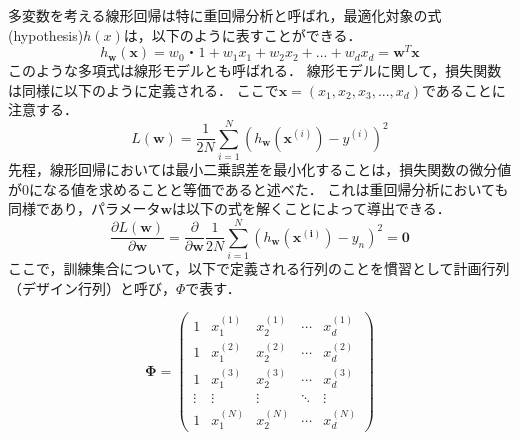     多変数を考える線形回帰は特に重回帰分析と呼ばれ，最適化対象の式(hypothesis)$h(x)$は，以下のように表すことができる．
    \begin{equation}
        h_{\bm{w}}(\bm{x}) = w_0・1 + w_1 x_1 + w_2 x_2 + ...  + w_d x_d = \bm{w}^T\bm{x}
    \end{equation}
    このような多項式は線形モデルとも呼ばれる．
    線形モデルに関して，損失関数は同様に以下のように定義される．
    ここで$\bm{x}=(x_1, x_2, x_3, ... , x_d)$であることに注意する．
    \begin{equation}
        L(\bm{w}) = \frac{1}{2N}\sum_{i=1}^{N}\left(h_{\bm{w}}(\bm{x}^{(i)})-y^{(i)}\right)^2
        \label{linerregression_loss_equation}
    \end{equation}
    先程，線形回帰においては最小二乗誤差を最小化することは，損失関数の微分値が0になる値を求めることと等価であると述べた．
    これは重回帰分析においても同様であり，パラメータ$\bm{w}$は以下の式を解くことによって導出できる．
    \begin{equation}
        \frac{\partial L(\boldsymbol{w})}{\partial \boldsymbol{w}}=\frac{\partial}{\partial \boldsymbol{w}} \frac{1}{2N} \sum_{i=1}^{N}\left(h_{\boldsymbol{w}}(\boldsymbol{x}^{(\boldsymbol{i})})-y_{n}\right)^{2}=\mathbf{0}
    \end{equation}
    ここで，訓練集合について，以下で定義される行列のことを慣習として計画行列（デザイン行列）と呼び，$\Phi$で表す．
    
    \begin{equation}
        \bm{\Phi}=\left(
            \begin{array}{ccccc}
                1 & x^{(1)}_1 & x^{(1)}_2 & \cdots & x^{(1)}_d \\
                1 & x^{(2)}_1 & x^{(2)}_2 & \cdots & x^{(2)}_d \\
                1 & x^{(3)}_1 & x^{(3)}_2 & \cdots & x^{(3)}_d \\
                \vdots & \vdots & \vdots & \ddots & \vdots \\
                1 & x^{(N)}_1 & x^{(N)}_2 & \cdots & x^{(N)}_d
            \end{array}\right)
    \end{equation}
    
